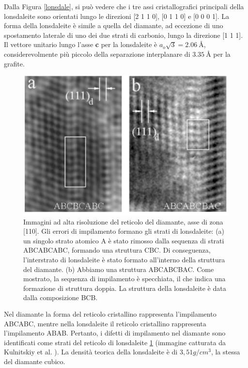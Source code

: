 \documentclass[a4paper,titlepage]{book}
\begin{document}
Dalla Figura \ref{lonsdale}, si può vedere che i tre assi cristallografici principali della lonsdaleite sono orientati lungo le direzioni [2 1 1 0], [0 1 1 0] e [0 0 0 1].
La forma della lonsdaleite è simile a quella del diamante, ad eccezione di uno spostamento laterale di uno dei due strati di carbonio, lungo la direzione [1 1 1]. Il vettore unitario lungo l'asse \textbf{c} per la lonsdaleite è $a_o \sqrt{3} = \SI{2,06}{ \angstrom}$, considerevolmente più piccolo della separazione interplanare di $\SI{3,35}{\angstrom}$ per la grafite.
\begin{figure}[h!] 
	\centering
	\includegraphics[width=0.8\columnwidth]{InfiltroLons.png}
	\caption{ 	\label{lonsdaleite}
		Immagini ad alta risoluzione del reticolo del diamante, asse di zona [110]. Gli errori di impilamento formano gli strati di lonsdaleite: (a) un singolo strato atomico A è stato rimosso dalla sequenza di strati ABCABCABC, formando una struttura CBC. Di conseguenza, l'interstrato di lonsdaleite è stato formato all'interno della struttura del diamante. (b) Abbiamo una struttura ABCABCBAC. Come mostrato, la sequenza di impilamento è specchiata, il che indica una formazione di struttura doppia. La struttura della lonsdaleite è data dalla composizione BCB.
	}
\end{figure}
Nel diamante la forma del reticolo cristallino rappresenta l'impilamento ABCABC, mentre nella lonsdaleite il reticolo cristallino rappresenta l'impilamento ABAB. Pertanto, i difetti di impilamento nel diamante sono identificati come strati del reticolo di lonsdaleite \ref{lonsdaleite} (immagine catturata da Kulnitskiy et al. \cite{Kulni}). La densità teorica della lonsdaleite è di $3,51 g/cm^3$, la stessa del diamante cubico. 
\end{document}
